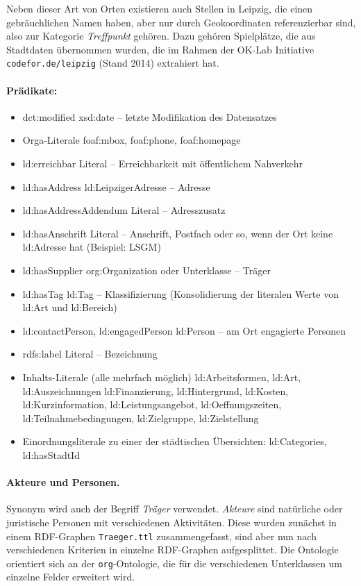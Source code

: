 \documentclass[a4paper,11pt]{article}
\begin{document}
Neben dieser Art von Orten existieren auch Stellen in Leipzig, die einen
gebräuchlichen Namen haben, aber nur durch Geokoordinaten referenzierbar sind,
also zur Kategorie \emph{Treffpunkt} gehören. Dazu gehören Spielplätze, die
aus Stadtdaten übernommen wurden, die im Rahmen der OK-Lab Initiative
\texttt{codefor.de/leipzig} (Stand 2014) extrahiert hat.

\paragraph{Prädikate:}
\begin{itemize}\itemsep0pt
\item dct:modified xsd:date – letzte Modifikation des Datensatzes
\item Orga-Literale foaf:mbox, foaf:phone, foaf:homepage
\item ld:erreichbar Literal – Erreichbarkeit mit öffentlichem Nahverkehr
\item ld:hasAddress ld:LeipzigerAdresse – Adresse
\item ld:hasAddressAddendum Literal – Adresszusatz
\item ld:hasAnschrift Literal – Anschrift, Postfach oder so, wenn der Ort
  keine ld:Adresse hat (Beispiel: LSGM)
\item ld:hasSupplier org:Organization oder Unterklasse – Träger
\item ld:hasTag ld:Tag – Klassifizierung (Konsolidierung der literalen Werte
  von ld:Art und ld:Bereich)
\item ld:contactPerson, ld:engagedPerson ld:Person – am Ort engagierte
  Personen
\item rdfs:label Literal – Bezeichnung
\item Inhalts-Literale (alle mehrfach möglich) ld:Arbeitsformen, ld:Art,
  ld:Auszeichnungen ld:Finanzierung, ld:Hintergrund, ld:Kosten,
  ld:Kurzinformation, ld:Leistungsangebot, ld:Oeffnungszeiten,
  ld:Teilnahmebedingungen, ld:Zielgruppe, ld:Zielstellung
\item Einordnungsliterale zu einer der städtischen Übersichten: ld:Categories,
  ld:hasStadtId
\end{itemize}

\paragraph{Akteure und Personen.} 
Synonym wird auch der Begriff \emph{Träger} verwendet. \emph{Akteure} sind
natürliche oder juristische Personen mit verschiedenen Aktivitäten. Diese
wurden zunächst in einem RDF-Graphen \texttt{Traeger.ttl} zusammengefasst,
sind aber nun nach verschiedenen Kriterien in einzelne RDF-Graphen
aufgesplittet.  Die Ontologie orientiert sich an der \texttt{org}-Ontologie,
die für die verschiedenen Unterklassen um einzelne Felder erweitert wird.
\end{document}
